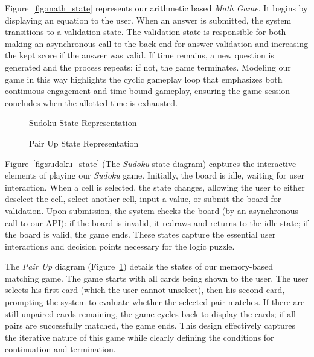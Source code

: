 \documentclass[11pt,a4paper]{article}
\newcommand{\inputdiagram}[1]{}
\newcommand{\textwidthdiagram}[2][1]{%
  \resizebox{#1\textwidth}{!}{\inputdiagram{#2}}%
}
\begin{document}
Figure~\ref{fig:math_state} represents our arithmetic based \textit{Math Game}. It
begins by displaying an equation to the user. When an answer is submitted, the
system transitions to a validation state. The validation state is responsible
for both making an asynchronous call to the back-end for answer validation
and increasing the kept score if the answer was valid. If time remains,
a new question is generated and the process repeats; if not, the game
terminates. Modeling our game in this way highlights the cyclic gameplay
loop that emphasizes both continuous engagement and time-bound gameplay,
ensuring the game session concludes when the allotted time is exhausted.

\begin{figure}[H]
    \centering
    \begin{minipage}[b]{0.48\textwidth}
        \centering
        \textwidthdiagram{sudoku_state.tex}
        \caption{Sudoku State Representation}
        \label{fig:sudoku_state}
    \end{minipage}
    \hfil
    \begin{minipage}[b]{0.48\textwidth}
        \centering
        \textwidthdiagram{pair_up_state.tex}
        \caption{Pair Up State Representation}
        \label{fig:pair_up_state}
    \end{minipage}
\end{figure}

Figure~\ref{fig:sudoku_state} (The \textit{Sudoku} state diagram) captures
the interactive elements of playing our \textit{Sudoku} game. Initially, the board
is idle, waiting for user interaction. When a cell is selected, the state
changes, allowing the user to either deselect the cell, select another
cell, input a value, or submit the board for validation. Upon submission,
the system checks the board (by an asynchronous call to our API): if the
board is invalid, it redraws and returns to the idle state; if the board
is valid, the game ends. These states capture the essential user interactions
and decision points necessary for the logic puzzle.

The \textit{Pair Up} diagram (Figure~\ref{fig:pair_up_state}) details the
states of our memory-based matching game. The game starts with all cards being
shown to the user. The user selects his first card (which the user cannot
unselect), then his second card, prompting the system to evaluate whether the
selected pair matches. If there are still unpaired cards remaining, the game cycles
back to display the cards; if all pairs are successfully matched,
the game ends. This design effectively captures the iterative nature of this
game while clearly defining the conditions for continuation and termination.
\end{document}

